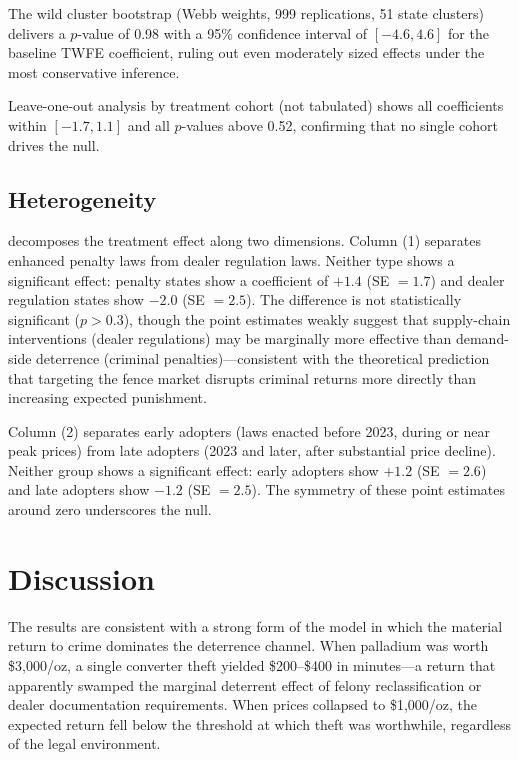 \documentclass[12pt]{article}
\begin{document}
The wild cluster bootstrap (Webb weights, 999 replications, 51 state clusters) delivers a $p$-value of 0.98 with a 95\% confidence interval of $[-4.6, 4.6]$ for the baseline TWFE coefficient, ruling out even moderately sized effects under the most conservative inference.

Leave-one-out analysis by treatment cohort (not tabulated) shows all coefficients within $[-1.7, 1.1]$ and all $p$-values above 0.52, confirming that no single cohort drives the null.

\subsection{Heterogeneity}



 decomposes the treatment effect along two dimensions. Column (1) separates enhanced penalty laws from dealer regulation laws. Neither type shows a significant effect: penalty states show a coefficient of $+1.4$ (SE $= 1.7$) and dealer regulation states show $-2.0$ (SE $= 2.5$). The difference is not statistically significant ($p > 0.3$), though the point estimates weakly suggest that supply-chain interventions (dealer regulations) may be marginally more effective than demand-side deterrence (criminal penalties)---consistent with the theoretical prediction that targeting the fence market disrupts criminal returns more directly than increasing expected punishment.

Column (2) separates early adopters (laws enacted before 2023, during or near peak prices) from late adopters (2023 and later, after substantial price decline). Neither group shows a significant effect: early adopters show $+1.2$ (SE $= 2.6$) and late adopters show $-1.2$ (SE $= 2.5$). The symmetry of these point estimates around zero underscores the null.

\section{Discussion}

The results are consistent with a strong form of the \citet{becker1968crime} model in which the material return to crime dominates the deterrence channel. When palladium was worth \$3,000/oz, a single converter theft yielded \$200--\$400 in minutes---a return that apparently swamped the marginal deterrent effect of felony reclassification or dealer documentation requirements. When prices collapsed to \$1,000/oz, the expected return fell below the threshold at which theft was worthwhile, regardless of the legal environment.
\end{document}
